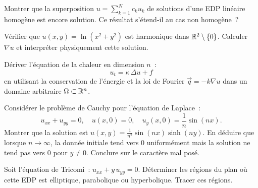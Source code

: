 \begin{exercice}
Montrer que la superposition $u = \sum_{k=1}^{N} c_k u_k$ de solutions
d'une EDP lin\'eaire homog\`ene est encore solution. Ce r\'esultat
s'\'etend-il au cas non homog\`ene~?
\end{exercice}

\begin{exercice}
V\'erifier que $u(x,y) = \ln(x^2 + y^2)$ est harmonique dans
$\mathbb{R}^2 \setminus \{0\}$. Calculer $\nabla u$ et interpr\'eter
physiquement cette solution.
\end{exercice}

\begin{exercice}
D\'eriver l'\'equation de la chaleur en dimension $n$~:
\[
    u_t = \kappa\, \Delta u + f
\]
en utilisant la conservation de l'\'energie et la loi de Fourier
$\vec{q} = -k \nabla u$ dans un domaine arbitraire $\Omega \subset \mathbb{R}^n$.
\end{exercice}

\begin{exercice}
Consid\'erer le probl\`eme de Cauchy pour l'\'equation de Laplace~:
\[
    u_{xx} + u_{yy} = 0, \quad u(x,0) = 0, \quad
    u_y(x,0) = \frac{1}{n}\sin(nx).
\]
Montrer que la solution est $u(x,y) = \frac{1}{n^2}\sin(nx)\sinh(ny)$.
En d\'eduire que lorsque $n \to \infty$, la donn\'ee initiale tend vers $0$
uniform\'ement mais la solution ne tend pas vers $0$ pour $y \neq 0$.
Conclure sur le caract\`ere mal pos\'e.
\end{exercice}

\begin{exercice}
Soit l'\'equation de Tricomi~: $u_{xx} + y\, u_{yy} = 0$.
D\'eterminer les r\'egions du plan o\`u cette EDP est elliptique,
parabolique ou hyperbolique. Tracer ces r\'egions.
\end{exercice}
